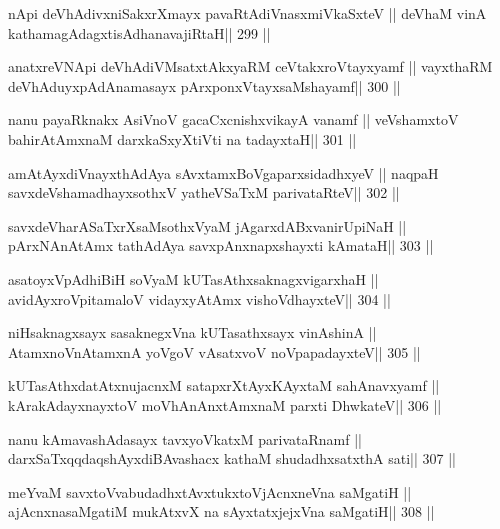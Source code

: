 \begin{shl}
nApi deVhAdivxniSakxrXmayx pavaRtAdiVnasxmiVkaSxteV ||
deVhaM vinA kathamagAdagxtisAdhanavajiRtaH\hfill || 299 ||
\end{shl}

\begin{shl}
anatxreVNApi deVhAdiVMsatxtAkxyaRM ceVtakxroVtayxyamf ||
vayxthaRM deVhAduyxpAdAnamasayx pArxponxVtayxsaMshayamf\hfill || 300 ||
\end{shl}

\begin{shl}
nanu payaRknakx AsiVnoV gacaCxcnishxvikayA vanamf ||
veVshamxtoV bahirAtAmxnaM darxkaSxyXtiVti na tadayxtaH\hfill || 301 ||
\end{shl}

\begin{shl}
amAtAyxdiVnayxthA\s\s dAya sAvxtamxBoVgaparxsidadhxyeV ||
naqpaH savxdeVshamadhayxsothxV yatheVSaTxM parivataRteV\hfill || 302 ||
\end{shl}

\begin{shl}
savxdeVharASaTxrXsaMsothxV\s yaM jAgarxdABxvanirUpiNaH ||
pArxNAnAtAmx tathA\s\s dAya savxpAnxnapxshayxti kAmataH\hfill || 303 ||
\end{shl}

\begin{shl}
asatoyxVpAdhiBiH soV\s yaM kUTasAthxsaknagxvigarxhaH ||
avidAyxroVpitamaloV vidayxyA\s\s tAmx vishoVdhayxteV\hfill || 304 ||
\end{shl}

\begin{shl}
niHsaknagxsayx sasaknegxVna kUTasathxsayx vinAshinA ||
AtamxnoV\s nAtamxnA yoVgoV vAsatxvoV noVpapadayxteV\hfill || 305 ||
\end{shl}

\begin{shl}
kUTasAthxdatAtxnujacnxM satapxrXtAyxKAyxtaM sahAnavxyamf ||
kArakAdayxnayxtoV moVhAnAnx\s\s tAmxnaM parxti DhwkateV\hfill || 306 ||
\end{shl}

\begin{shl}
nanu kAmavashAdasayx tavxyoVkatxM parivataRnamf ||
darxSaTxqqdaqshAyxdiBAvashacx kathaM shudadhxsatxthA sati\hfill || 307 ||
\end{shl}

\begin{shl}
meYvaM savxtoV\s vabudadhxtAvxtukxtoV\s jAcnxneVna saMgatiH ||
ajAcnxnasaMgatiM mukAtxvX na sAyxtatxjejxVna saMgatiH\hfill || 308 ||
\end{shl}

